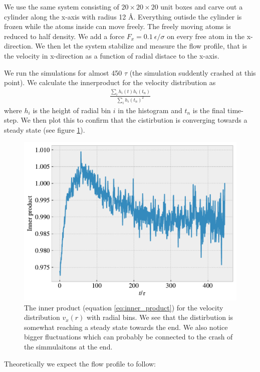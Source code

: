 \documentclass[reprint, amsmath, amssymb, aps]{revtex4-2}
\begin{document}
We use the same system consisting of $20 \times 20 \times 20$ unit boxes and carve out a cylinder along the x-axis with radius 12 Å. Everything outisde the cylinder is frozen while the atoms inside can move freely. The freely moving atoms is reduced to half density. We add a force $F_x = 0.1 \ \epsilon/\sigma$ on every free atom in the x-direction. We then let the system stabilize and measure the flow profile, that is the velocity in x-direction as a function of radial distace to the x-axis. \par
We run the simulations for almost 450 $\tau$ (the simulation suddently crashed at this point). We calculate the innerproduct for the velocity distribution as
\begin{align}
  \frac{\sum_i h_i(t)h_i(t_n)}{\sum_i h_i(t_n)^2}
  \label{eq:inner_product}
\end{align}
where $h_i$ is the height of radial bin $i$ in the histogram and $t_n$ is the final time-step. We then plot this to confirm that the cistirbution is converging towards a steady state (see figure \ref{fig:flow_inner_product}).
\begin{figure}[H]
  \includegraphics[width=\linewidth]{figures/flow_inner_product.pdf}
  \caption{The inner product (equation \ref{eq:inner_product}) for the velocity distribution $v_x(r)$ with radial bins. We see that the distirbution is somewhat reaching a steady state towards the end. We also notice bigger fluctuations which can probably be connected to the crash of the simmulaitons at the end.}
  \label{fig:flow_inner_product}
\end{figure}
Theoretically we expect the flow profile to follow:
\end{document}
